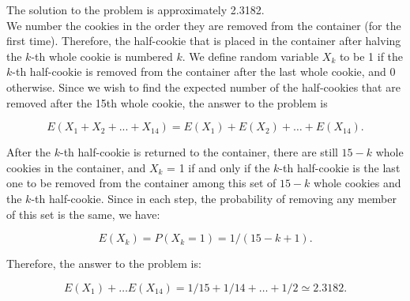 \begin{solution}
The solution to the problem is approximately 2.3182.\\[0.2cm]

We number the cookies in the order they are removed from the container (for the first time). Therefore, the half-cookie that is placed in the container after halving the $k$-th whole cookie is numbered $k$. We define random variable $X_k$ to be 1 if the $k$-th half-cookie is removed from the container after the last whole cookie, and 0 otherwise.
Since we wish to find the expected number of the half-cookies that are removed after the 15th whole cookie, the answer to the problem is

$$E(X_1 + X_2 + ... + X_{14}) = E(X_1) + E(X_2) + \ldots + E(X_{14}).$$

After the $k$-th half-cookie is returned to the container, there are still $15 - k$ whole cookies in the container, and $X_k$ = 1 if and only if the $k$-th half-cookie is the last one to be removed from the container among this set of $15 - k$ whole cookies and the $k$-th half-cookie. Since in each step, the probability of removing any member of this set is the same, we have:

$$E(X_k) = P(X_k = 1) = 1 / (15 - k + 1).$$

Therefore, the answer to the problem is:

$$E(X_1) + \ldots E(X_{14}) = 1/15 + 1/14 + \ldots + 1/2  \simeq 2.3182.$$


\end{solution}
